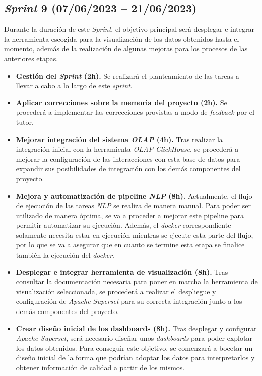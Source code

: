 \subsection{\textit{Sprint} 9 (07/06/2023 -- 21/06/2023)}

Durante la duración de este \textit{Sprint}, el objetivo principal será desplegar e integrar la herramienta escogida para la visualización de los datos obtenidos hasta el momento, además de la realización de algunas mejoras para los procesos de las anteriores etapas.

\begin{itemize}

    \item \textbf{Gestión del \textit{Sprint} (2h).} Se realizará el planteamiento de las tareas a llevar a cabo a lo largo de este \textit{sprint}.

    \item \textbf{Aplicar correcciones sobre la memoria del proyecto (2h).} Se procederá a implementar las correcciones provistas a modo de \textit{feedback} por el tutor.

    \item \textbf{Mejorar integración del sistema \textit{OLAP} (4h).} Tras realizar la integración inicial con la herramienta \textit{OLAP ClickHouse}, se procederá a mejorar la configuración de las interacciones con esta base de datos para expandir sus posibilidades de integración con los demás componentes del proyecto.

    \item \textbf{Mejora y automatización de pipeline \textit{NLP} (8h).} Actualmente, el flujo de ejecución de las tareas \textit{NLP} se realiza de manera manual. Para poder ser utilizado de manera óptima, se va a proceder a mejorar este pipeline para permitir automatizar su ejecución. Además, el \textit{docker} correspondiente solamente necesita estar en ejecución mientras se ejecute esta parte del flujo, por lo que se va a asegurar que en cuanto se termine esta etapa se finalice también la ejecución del \textit{docker}.

    \item \textbf{Desplegar e integrar herramienta de visualización (8h).} Tras consultar la documentación necesaria para poner en marcha la herramienta de visualización seleccionada, se procederá a realizar el despliegue y configuración de \textit{Apache Superset} para su correcta integración junto a los demás componentes del proyecto.

    \item \textbf{Crear diseño inicial de los dashboards (8h).} Tras desplegar y configurar \textit{Apache Superset}, será necesario diseñar unos \textit{dashboards} para poder explotar los datos obtenidos. Para conseguir este objetivo, se comenzará a bocetar un diseño inicial de la forma que podrían adoptar los datos para interpretarlos y obtener información de calidad a partir de los mismos.

\end{itemize}


